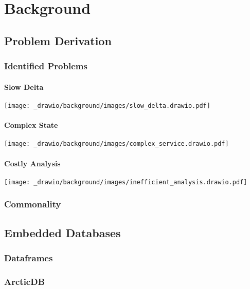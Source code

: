 \chapter{Background}

\section{Problem Derivation}
\subsection{Identified Problems}
\subsubsection{Slow Delta}
\begin{center}
    \texttt{[image: \_drawio/background/images/slow\_delta.drawio.pdf]}
\end{center}

\subsubsection{Complex State}
\begin{center}
    \texttt{[image: \_drawio/background/images/complex\_service.drawio.pdf]}
\end{center}
\subsubsection{Costly Analysis}
\begin{center}
    \texttt{[image: \_drawio/background/images/inefficient\_analysis.drawio.pdf]}
\end{center}

\subsection{Commonality}

\section{Embedded Databases}

\subsection{Dataframes}
\subsection{ArcticDB}
